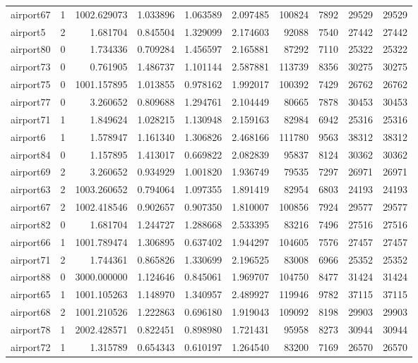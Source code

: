 \begin{longtable}{|l|r|r|r|r|r|r|r|r|r|}
airport67 & 1 & 1002.629073 & 1.033896 & 1.063589 & 2.097485 & 100824 & 7892 & 29529 & 29529 \\
airport5 & 2 & 1.681704 & 0.845504 & 1.329099 & 2.174603 & 92088 & 7540 & 27442 & 27442 \\
airport80 & 0 & 1.734336 & 0.709284 & 1.456597 & 2.165881 & 87292 & 7110 & 25322 & 25322 \\
airport73 & 0 & 0.761905 & 1.486737 & 1.101144 & 2.587881 & 113739 & 8356 & 30275 & 30275 \\
airport75 & 0 & 1001.157895 & 1.013855 & 0.978162 & 1.992017 & 100392 & 7429 & 26762 & 26762 \\
airport77 & 0 & 3.260652 & 0.809688 & 1.294761 & 2.104449 & 80665 & 7878 & 30453 & 30453 \\
airport71 & 1 & 1.849624 & 1.028215 & 1.130948 & 2.159163 & 82984 & 6942 & 25316 & 25316 \\
airport6 & 1 & 1.578947 & 1.161340 & 1.306826 & 2.468166 & 111780 & 9563 & 38312 & 38312 \\
airport84 & 0 & 1.157895 & 1.413017 & 0.669822 & 2.082839 & 95837 & 8124 & 30362 & 30362 \\
airport69 & 2 & 3.260652 & 0.934929 & 1.001820 & 1.936749 & 79535 & 7297 & 26971 & 26971 \\
airport63 & 2 & 1003.260652 & 0.794064 & 1.097355 & 1.891419 & 82954 & 6803 & 24193 & 24193 \\
airport67 & 2 & 1002.418546 & 0.902657 & 0.907350 & 1.810007 & 100856 & 7924 & 29577 & 29577 \\
airport82 & 0 & 1.681704 & 1.244727 & 1.288668 & 2.533395 & 83216 & 7496 & 27516 & 27516 \\
airport66 & 1 & 1001.789474 & 1.306895 & 0.637402 & 1.944297 & 104605 & 7576 & 27457 & 27457 \\
airport71 & 2 & 1.744361 & 0.865826 & 1.330699 & 2.196525 & 83008 & 6966 & 25352 & 25352 \\
airport88 & 0 & 3000.000000 & 1.124646 & 0.845061 & 1.969707 & 104750 & 8477 & 31424 & 31424 \\
airport65 & 1 & 1001.105263 & 1.148970 & 1.340957 & 2.489927 & 119946 & 9782 & 37115 & 37115 \\
airport68 & 2 & 1001.210526 & 1.222863 & 0.696180 & 1.919043 & 109092 & 8198 & 29903 & 29903 \\
airport78 & 1 & 2002.428571 & 0.822451 & 0.898980 & 1.721431 & 95958 & 8273 & 30944 & 30944 \\
airport72 & 1 & 1.315789 & 0.654343 & 0.610197 & 1.264540 & 83200 & 7169 & 26570 & 26570 \\

\end{longtable}
